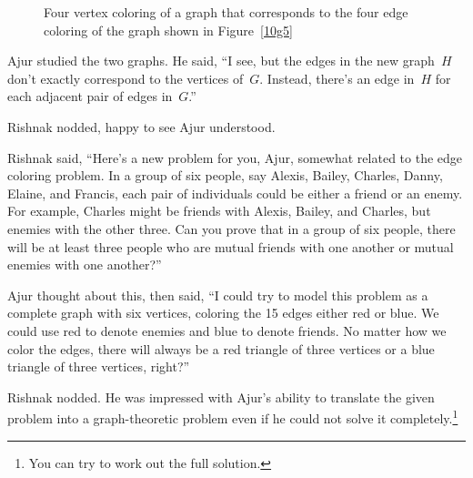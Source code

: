 \begin{figure}
\begin{center}


\caption{Four vertex coloring of a graph that corresponds to the four edge coloring of the graph shown in Figure~\ref{10g5}}\label{10g55}
\end{center}
\end{figure}

Ajur studied the two graphs. He said, ``I see, but the edges in the new graph~$H$ don't exactly correspond to the vertices of~$G$. Instead, there's an edge in~$H$ for each adjacent pair of edges in~$G$.''

Rishnak nodded, happy to see Ajur understood.

Rishnak said, ``Here's a new problem for you, Ajur, somewhat related to the edge coloring problem. In a group of six people, say Alexis, Bailey, Charles, Danny, Elaine, and Francis, each pair of individuals could be either a friend or an enemy. For example, Charles might be friends with Alexis, Bailey, and Charles, but enemies with the other three. Can you prove that in a group of six people, there will be at least three people who are mutual friends with one another or mutual enemies with one another?''

Ajur thought about this, then said, ``I could try to model this problem as a complete graph with six vertices, coloring the 15 edges either red or blue. We could use red to denote enemies and blue to denote friends. No matter how we color the edges, there will always be a red triangle of three vertices or a blue triangle of three vertices, right?''

Rishnak nodded. He was impressed with Ajur's ability to translate the given problem into a graph-theoretic problem even if he could not solve it completely.\footnote{You can try to work out the full solution.}

